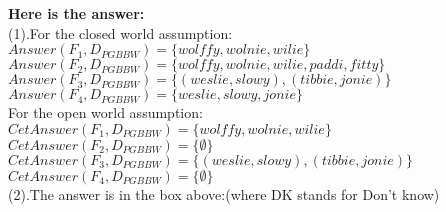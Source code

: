\documentclass{article}
\begin{document}
    \begin{table}[ht] 
    \begin{center}
    \label{BooleanQueries}
    \end{center}

    \textbf{Here is the answer:}\\
    (1).For the closed world assumption:\\
    $Answer(F_1,D_{PGBBW})=\{wolffy, wolnie, wilie\}$\\
    $Answer(F_2,D_{PGBBW})=\{wolffy, wolnie, wilie, paddi, fitty\}$\\
    $Answer(F_3,D_{PGBBW})=\{(weslie, slowy),(tibbie, jonie)\}$\\
    $Answer(F_4,D_{PGBBW})=\{weslie, slowy, jonie\}$\\
    For the open world assumption:\\
    $CetAnswer(F_1,D_{PGBBW})=\{wolffy, wolnie, wilie\}$\\
    $CetAnswer(F_2,D_{PGBBW})=\{\emptyset\}$\\
    $CetAnswer(F_3,D_{PGBBW})=\{(weslie, slowy),(tibbie, jonie)\}$\\
    $CetAnswer(F_4,D_{PGBBW})=\{\emptyset\}$\\
    (2).The answer is in the box above:(where DK stands for Don't know)\\
    
    \end{table}
    
\end{document}
